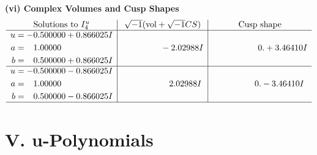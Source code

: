 \documentclass[1p]{elsarticle_modified}
\theoremstyle{definition}
\newcommand{\I}{\sqrt{-1}}
\begin{document}
\newpage\flushleft \textbf{(vi) Complex Volumes and Cusp Shapes}
$$\begin{array}{c|c|c}  
\text{Solutions to }I^u_{4}& \I (\text{vol} + \sqrt{-1}CS) & \text{Cusp shape}\\
 \hline 
\begin{aligned}
u &= -0.500000 + 0.866025 I \\
a &= \phantom{-}1.00000\phantom{ +0.000000I} \\
b &= \phantom{-}0.500000 + 0.866025 I\end{aligned}
 & \phantom{-0.000000 } -2.02988 I & \phantom{-0.000000 -}0. + 3.46410 I \\ \hline\begin{aligned}
u &= -0.500000 - 0.866025 I \\
a &= \phantom{-}1.00000\phantom{ +0.000000I} \\
b &= \phantom{-}0.500000 - 0.866025 I\end{aligned}
 & \phantom{-0.000000 -}2.02988 I & \phantom{-0.000000 } 0. - 3.46410 I\\
 \hline 
 \end{array}$$\newpage
\newpage\renewcommand{\arraystretch}{1}
\centering \section*{ V. u-Polynomials}
\end{document}
